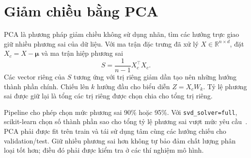 \section{Giảm chiều bằng PCA}
\label{sec:2_3}
PCA là phương pháp giảm chiều không sử dụng nhãn, tìm các hướng trực giao giữ nhiều phương sai của dữ liệu. Với ma trận đặc trưng đã xử lý $X\in\mathbb{R}^{n\times d}$, đặt $X_c=X-\boldsymbol{\mu}$ và ma trận hiệp phương sai
\begin{equation}
S=\frac{1}{n-1}X_c^\top X_c.
\end{equation}
Các vector riêng của $S$ tương ứng với trị riêng giảm dần tạo nên những hướng thành phần chính. Chiếu lên $k$ hướng đầu cho biểu diễn $Z=X_cW_k$. Tỷ lệ phương sai được giữ lại là tổng các trị riêng được chọn chia cho tổng trị riêng.

Pipeline cho phép chọn mức phương sai 90\% hoặc 95\%. Với \texttt{svd\_solver=full}, scikit-learn chọn số thành phần sao cho tổng tỷ lệ phương sai vượt mức yêu cầu~\cite{sklearn-pca}. PCA phải được fit trên train và tái sử dụng tâm cùng các hướng chiếu cho validation/test. Giữ nhiều phương sai hơn không tự bảo đảm chất lượng phân loại tốt hơn; điều đó phải được kiểm tra ở các thí nghiệm mô hình.
